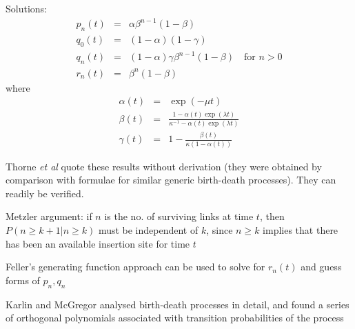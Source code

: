\documentclass{beamer}
\begin{document}
\begin{frame}{}
Solutions:
\begin{eqnarray*}
p_n(t) & = & \alpha \beta^{n-1} (1-\beta) \\
q_0(t) & = & (1-\alpha) (1-\gamma) \\
q_n(t) & = & (1-\alpha) \gamma \beta^{n-1} (1-\beta) \quad \mbox{for $n>0$} \\
r_n(t) & = & \beta^n (1-\beta)
\end{eqnarray*}
where
\begin{eqnarray*}
\alpha(t) & = & \exp (-\mu t) \\
\beta(t) & = & \frac{1 - \alpha(t) \exp(\lambda t)}{\kappa^{-1} - \alpha(t) \exp(\lambda t)} \\
\gamma(t) & = & 1 - \frac{\beta(t)}{\kappa(1-\alpha(t))}
\end{eqnarray*}
\end{frame}

\begin{frame}{}
\itemb
 \item Thorne {\em et al} quote these results without derivation (they were obtained by comparison with formulae for similar generic birth-death processes).
They can readily be verified.
 \item Metzler argument: if $n$ is the no. of surviving links at time $t$, then $P(n \geq k+1|n \geq k)$ must be independent of $k$,
since $n \geq k$ implies that there has been an available insertion site for time $t$
 \item Feller's generating function approach can be used to solve for $r_n(t)$ and guess forms of $p_n,q_n$
 \item Karlin and McGregor analysed birth-death processes in detail,
and found a series of orthogonal polynomials associated with transition probabilities of the process
\iteme
\end{frame}
\end{document}

